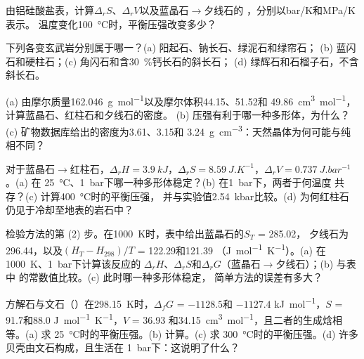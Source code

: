 \begin{exercise}[$\star$]\label{exo:b2:metamorphic-facies:2}
由铝硅酸盐表，计算$\Delta_r S$、$\Delta_r V$以及蓝晶石$\to$夕线石的
，分别以\unit{bar/K}和\unit{MPa/K}表示。
温度变化\qty{100}{\celsius}时，平衡压强改变多少？
\end{exercise}

\begin{exercise}[$\star$]\label{exo:b2:metamorphic-facies:3}
下列各变玄武岩分别属于哪一？(a) 阳起石、钠长石、绿泥石和绿帘石；
(b) 蓝闪石和硬柱石；(c) 角闪石和含\qty{30}{\percent}钙长石的斜长石；
(d) 绿辉石和石榴子石，不含斜长石。
\end{exercise}

\begin{exercise}[$\star$]\label{exo:b2:metamorphic-facies:4}
(a) 由摩尔质量\qty{162.046}{g.mol^{-1}}以及摩尔体积44.15、51.52和
\qty{49.86}{cm^3.mol^{-1}}，计算蓝晶石、红柱石和夕线石的密度。
(b) 压强有利于哪一种多形体，为什么？(c) 矿物数据库给出的密度为3.61、3.15和
\qty{3.24}{g.cm^{-3}}：天然晶体为何可能与纯相不同？
\end{exercise}

\begin{exercise}[$\star\star$]\label{exo:b2:metamorphic-facies:5}
对于蓝晶石$\to$红柱石，$\Delta_r H = \qty{3.9}{kJ}$，$\Delta_r S =
\qty{8.59}{J.K^{-1}}$，$\Delta_r V = \qty{0.737}{J.bar^{-1}}$。(a) 在
\qty{25}{\celsius}、\qty{1}{bar}下哪一种多形体稳定？(b) 在\qty{1}{bar}下，两者于何温度
共存？(c) 计算\qty{400}{\celsius}时的平衡压强，
并与实验值\qty{2.54}{kbar}比较。(d) 为何红柱石
仍见于冷却至地表的岩石中？
\end{exercise}

\begin{exercise}[$\star\star$]\label{exo:b2:metamorphic-facies:6}
检验方法的第 (2) 步。在\qty{1000}{K}时，表中给出蓝晶石的$S_T$ = 285.02，
夕线石为296.44，以及$(H_T - H_{298})/T$ = 122.29和121.39
（\unit{J.mol^{-1}.K^{-1}}）。(a) 在\qty{1000}{K}、\qty{1}{bar}下计算该反应的
$\Delta_r H$、$\Delta_r S$和$\Delta_r G$（蓝晶石$\to$夕线石）；(b) 与表中
的常数值比较。(c) 此时哪一种多形体稳定，
简单方法的误差有多大？
\end{exercise}

\begin{exercise}[$\star\star$]\label{exo:b2:metamorphic-facies:7}
方解石与文石（）在\qty{298.15}{K}时，$\Delta_f G$ = $-1128.5$和
$-1127.4$ \unit{kJ.mol^{-1}}，$S$ = 91.7和88.0 \unit{J.mol^{-1}.K^{-1}}，$V$ = 36.93
和\qty{34.15}{cm^3.mol^{-1}}，且二者的生成焓相等。(a) 求
\qty{25}{\celsius}时的平衡压强。(b) 计算。(c) 求
\qty{300}{\celsius}时的平衡压强。(d) 许多贝壳由文石构成，且生活在
\qty{1}{bar}下：这说明了什么？
\end{exercise}

